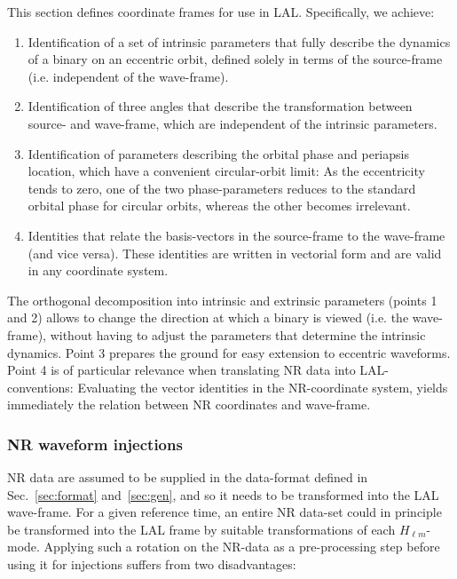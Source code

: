 \documentclass[11pt,tightenlines,article,amssymb,amsmath,amsfonts,superscriptaddress]{revtex4}
\begin{document}
This section defines coordinate frames for use in LAL.  Specifically, we
achieve:
\begin{enumerate}
  \item Identification of a set of intrinsic parameters that fully
    describe the dynamics of a binary on an eccentric orbit,
    defined solely in terms of the source-frame (i.e. independent of
    the wave-frame).
  \item Identification of three angles that describe the
    transformation between source- and wave-frame, which are
    independent of the intrinsic parameters.
  \item Identification of parameters describing the orbital phase and
    periapsis location, which have a convenient circular-orbit limit:
    As the eccentricity tends to zero, one of the two phase-parameters
    reduces to the standard orbital phase for circular orbits, whereas
    the other becomes irrelevant.
  \item Identities that relate the basis-vectors in the source-frame to the
    wave-frame (and vice versa).  These identities are written in
    vectorial form and are valid in any coordinate system.
\end{enumerate}

The orthogonal decomposition into intrinsic and extrinsic parameters
(points 1 and 2) allows to change the direction at which a binary is
viewed (i.e. the wave-frame), without having to adjust the parameters
that determine the intrinsic dynamics.  Point 3 prepares the ground
for easy extension to eccentric waveforms.
Point 4 is of particular relevance when translating NR data into
LAL-conventions: Evaluating the vector identities in the NR-coordinate
system, yields immediately the relation between NR coordinates and
wave-frame.


\subsubsection{NR waveform injections}

NR data are assumed to be supplied in the data-format defined in
Sec.~\ref{sec:format} and~\ref{sec:gen}, and so it needs to be
transformed into the LAL wave-frame.  For a given reference time, an
entire NR data-set could in principle be transformed into the LAL
frame by suitable transformations of each $H_{\ell m}$-mode.  Applying
such a rotation on the NR-data as a pre-processing step
before using it for injections suffers from two disadvantages:
\end{document}
